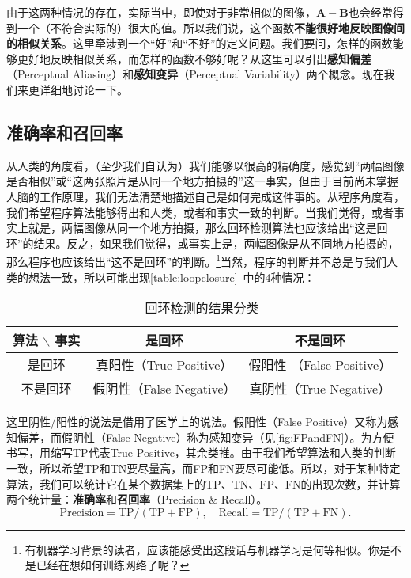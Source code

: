 由于这两种情况的存在，实际当中，即使对于非常相似的图像，$\bm{A}-\bm{B}$也会经常得到一个（不符合实际的）很大的值。所以我们说，这个函数\textbf{不能很好地反映图像间的相似关系}。这里牵涉到一个“好”和“不好”的定义问题。我们要问，怎样的函数能够更好地反映相似关系，而怎样的函数不够好呢？从这里可以引出\textbf{感知偏差}（Perceptual Aliasing）和\textbf{感知变异}（Perceptual Variability）两个概念。现在我们来更详细地讨论一下。

\subsection{准确率和召回率}
从人类的角度看，（至少我们自认为）我们能够以很高的精确度，感觉到“两幅图像是否相似”或“这两张照片是从同一个地方拍摄的”这一事实，但由于目前尚未掌握人脑的工作原理，我们无法清楚地描述自己是如何完成这件事的。从程序角度看，我们希望程序算法能够得出和人类，或者和事实一致的判断。当我们觉得，或者事实上就是，两幅图像从同一个地方拍摄，那么回环检测算法也应该给出“这是回环”的结果。反之，如果我们觉得，或事实上是，两幅图像是从不同地方拍摄的，那么程序也应该给出“这不是回环”的判断。\footnote{有机器学习背景的读者，应该能感受出这段话与机器学习是何等相似。你是不是已经在想如何训练网络了呢？}当然，程序的判断并不总是与我们人类的想法一致，所以可能出现\autoref{table:loopclosure}~中的4种情况：

\begin{table}[!htp]
\centering
\caption{回环检测的结果分类}
\label{table:loopclosure}
\begin{tabu}{c|c|c}
	\toprule
	算法 $\backslash$ 事实 & 是回环 & 不是回环 \\ 
	\midrule
	是回环 & 真阳性（True Positive） & 假阳性 （False Positive） \\ 
	不是回环 & 假阴性（False Negative） & 真阴性（True Negative） \\ 
	\bottomrule
\end{tabu} 
\end{table}

这里阴性/阳性的说法是借用了医学上的说法。假阳性（False  Positive）又称为感知偏差，而假阴性（False Negative）称为感知变异（见\autoref{fig:FPandFN}）。为方便书写，用缩写TP代表True Positive，其余类推。由于我们希望算法和人类的判断一致，所以希望TP和TN要尽量高，而FP和FN要尽可能低。所以，对于某种特定算法，我们可以统计它在某个数据集上的TP、TN、FP、FN的出现次数，并计算两个统计量：\textbf{准确率}和\textbf{召回率}（Precision \& Recall）。
\begin{equation}
\mathrm{Precision} = \mathrm{TP}/(\mathrm{TP}+\mathrm{FP}), \quad \mathrm{Recall} = \mathrm{TP}/(\mathrm{TP}+\mathrm{FN}).
\end{equation}

